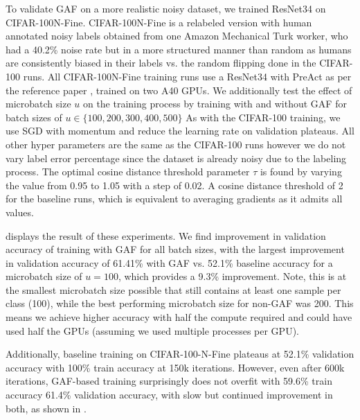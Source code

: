 To validate GAF on a more realistic noisy dataset, we trained ResNet34 on CIFAR-100N-Fine. CIFAR-100N-Fine is a relabeled version with human annotated noisy labels obtained from one Amazon Mechanical Turk worker, who had a 40.2\% noise rate but in a more structured manner than random as humans are consistently biased in their labels vs. the random flipping done in the CIFAR-100 runs. All CIFAR-100N-Fine training runs use a ResNet34 with PreAct as per the reference paper \cite{wei2022learning}, trained on two A40 GPUs. We additionally test the effect of microbatch size $u$ on the training process by training with and without GAF for batch sizes of $u \in \{100, 200, 300, 400, 500\}$ As with the CIFAR-100 training, we use SGD with momentum and reduce the learning rate on validation plateaus. All other hyper parameters are the same as the CIFAR-100 runs however we do not vary label error percentage since the dataset is already noisy due to the labeling process. The optimal cosine distance threshold parameter $\tau$ is found by varying the value from 0.95 to 1.05 with a step of 0.02. A cosine distance threshold of 2 for the baseline runs, which is equivalent to averaging gradients as it admits all values.



 displays the result of these experiments. We find improvement in validation accuracy of training with GAF for all batch sizes, with the largest improvement in validation accuracy of 61.41\% with GAF vs. 52.1\% baseline accuracy for a microbatch size of $u = 100$, which provides a 9.3\% improvement. Note, this is at the smallest microbatch size possible that still contains at least one sample per class (100), while the best performing microbatch size for non-GAF was 200. This means we achieve higher accuracy with half the compute required and could have used half the GPUs (assuming we used multiple processes per GPU). 

Additionally, baseline training on CIFAR-100-N-Fine plateaus at 52.1\% validation accuracy with 100\% train accuracy at 150k iterations. However, even after 600k iterations, GAF-based training surprisingly does not overfit with 59.6\% train accuracy 61.4\% validation accuracy, with slow but continued improvement in both, as shown in .

